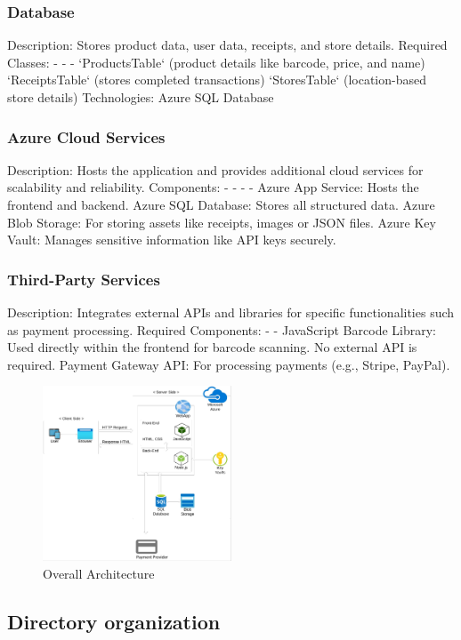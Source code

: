 \documentclass[conference]{IEEEtran}
\begin{document}
\subsubsection{Database}
Description: Stores product data, user data, receipts, and store details. 
Required Classes: - - - 
`ProductsTable` (product details like barcode, price, and name) 
`ReceiptsTable` (stores completed transactions) 
`StoresTable` (location-based store details) 
Technologies: Azure SQL Database 
\subsubsection{Azure Cloud Services}
Description: Hosts the application and provides additional cloud services for scalability 
and reliability. 
Components: - - - - 
Azure App Service: Hosts the frontend and backend. 
Azure SQL Database: Stores all structured data. 
Azure Blob Storage: For storing assets like receipts, images or JSON files. 
Azure Key Vault: Manages sensitive information like API keys securely. 
\subsubsection{Third-Party Services}
Description: Integrates external APIs and libraries for specific functionalities such as 
payment processing. 
Required Components: - - 
JavaScript Barcode Library: Used directly within the frontend for barcode 
scanning. No external API is required. 
Payment Gateway API: For processing payments (e.g., Stripe, PayPal).

\begin{figure}[H]  %
    \centering  %
    \includegraphics[width=0.5\textwidth]{architecture.jpg}  %
    \caption{Overall Architecture}  %
\end{figure}

\subsection{Directory organization}
\end{document}
